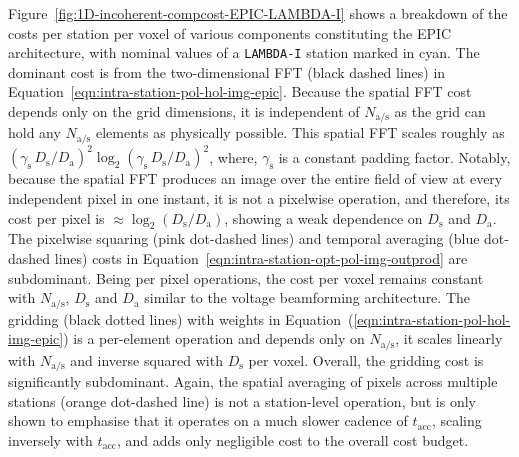 \documentclass[
  journal=pasa,
  manuscript=article-type,
  year=2020,
  volume=37,
]{cup-journal}
\begin{document}

Figure~\ref{fig:1D-incoherent-compcost-EPIC-LAMBDA-I} shows a breakdown of the costs per station per voxel of various components constituting the EPIC architecture, with nominal values of a \texttt{LAMBDA-I} station marked in cyan. The dominant cost is from the two-dimensional FFT (black dashed lines) in Equation~\ref{eqn:intra-station-pol-hol-img-epic}.
Because the spatial FFT cost depends only on the grid dimensions, it is independent of $N_\textrm{a/s}$ as the grid can hold any $N_\textrm{a/s}$ elements as physically possible. This spatial FFT scales roughly as $(\gamma_\textrm{s} \, D_\textrm{s}/D_\textrm{a})^2\log_2(\gamma_\textrm{s}\, D_\textrm{s}/D_\textrm{a})^2$, where, $\gamma_\textrm{s}$ is a constant padding factor. Notably, because the spatial FFT produces an image over the entire field of view at every independent pixel in one instant, it is not a pixelwise operation, and therefore, its cost per pixel is $\approx \log_2(D_\textrm{s}/D_\textrm{a})$, showing a weak dependence on $D_\textrm{s}$ and $D_\textrm{a}$. The pixelwise squaring (pink dot-dashed lines) and temporal averaging (blue dot-dashed lines) costs in Equation~\ref{eqn:intra-station-opt-pol-img-outprod}
are subdominant. Being per pixel operations, the cost per voxel remains constant with $N_\textrm{a/s}$, $D_\textrm{s}$ and $D_\textrm{a}$ similar to the voltage beamforming architecture. The gridding (black dotted lines) with weights in Equation~(\ref{eqn:intra-station-pol-hol-img-epic})
is a per-element operation and depends only on $N_\textrm{a/s}$, it scales linearly with $N_\textrm{a/s}$ and inverse squared with $D_\textrm{s}$ per voxel. Overall, the gridding cost is significantly subdominant. Again, the spatial averaging of pixels across multiple stations (orange dot-dashed line) is not a station-level operation, but is only shown to emphasise that it operates on a much slower cadence of $t_\textrm{acc}$, scaling inversely with $t_\textrm{acc}$, and adds only negligible cost to the overall cost budget. 
\end{document}
